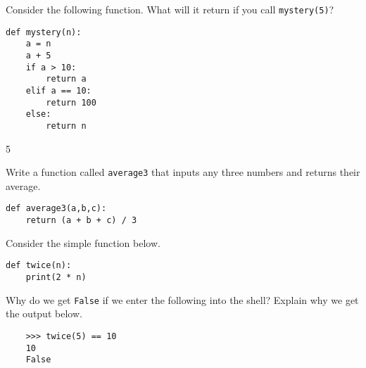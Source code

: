 \documentclass[12pt]{exam}
\begin{document}
\begin{questions}

\newpage
\question Consider the following function.  What will it return if you call \lstinline{mystery(5)}?

\begin{lstlisting}
def mystery(n):
    a = n 
    a + 5
    if a > 10:
        return a
    elif a == 10:
        return 100
    else:
        return n
\end{lstlisting}
\begin{solution}
5
\end{solution}

\question Write a function called \lstinline{average3} that inputs any three numbers and returns their average.  
\begin{solution}
\begin{lstlisting}
def average3(a,b,c):
    return (a + b + c) / 3
\end{lstlisting}
\end{solution}
\vfill

\question Consider the simple function below.

\begin{lstlisting}
def twice(n):
    print(2 * n)
\end{lstlisting}

Why do we get \lstinline{False} if we enter the following into the shell? Explain why we get the output below. 

\begin{verbatim}
    >>> twice(5) == 10
    10
    False
\end{verbatim}


\end{questions}
\end{document}
